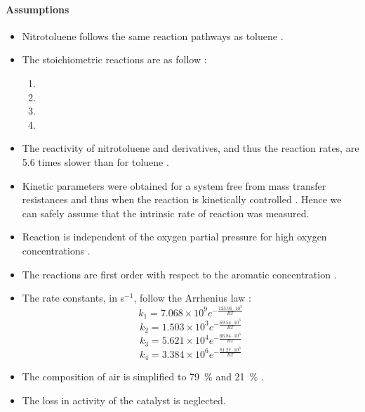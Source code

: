 \paragraph{Assumptions}
\begin{itemize}
    \item Nitrotoluene follows the same reaction pathways as toluene \cite{wendt_reaction_1986}.
    \item The stoichiometric reactions are as follow \cite{hoorn_modelling_2005}:
    \begin{enumerate}
        \item {}
        \item {}
        \item {}
        \item {}
    \end{enumerate}
    \item The reactivity of nitrotoluene and derivatives, and thus the reaction rates, are 5.6 times slower than for toluene \cite{partenheimer_methodology_1995}.
    \item Kinetic parameters were obtained for a system free from mass transfer resistances and thus when the reaction is kinetically controlled \cite{chandalia_kinetics_1999}. Hence we can safely assume that the intrinsic rate of reaction was measured.
    \item Reaction is independent of the oxygen partial pressure for high oxygen concentrations \cite{tan_kinetic_2010}.
    \item The reactions are first order with respect to the aromatic concentration \cite{chandalia_kinetics_1999}.
    \item The rate constants, in s$^{-1}$, follow the Arrhenius law \cite{tan_kinetic_2010}:
 \begin{equation}
                k_1=7.068 \times 10^9 e^{-\frac{123.91\cdot 10^{3}}{RT}}
                     \end{equation}
\begin{equation}
                k_2=1.503 \times 10^3 e^{-\frac{69.54\cdot 10^{3}}{RT}}
            \end{equation}
 \begin{equation}
                k_3=5.621 \times 10^4 e^{-\frac{66.84\cdot 10^{3}}{RT}}
            \end{equation}
 \begin{equation}
                k_4=3.384 \times 10^6 e^{-\frac{81.27\cdot 10^{3}}{RT}}
            \end{equation}    

    \item The composition of air is simplified to \SI{79}{\percent}  and \SI{21}{\percent} .
    \item The loss in activity of the catalyst is neglected.
\end{itemize}

